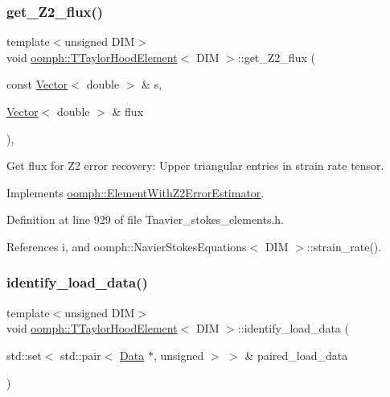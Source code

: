 \subsubsection{\texorpdfstring{get\+\_\+\+Z2\+\_\+flux()}{get\_Z2\_flux()}}
{\footnotesize\ttfamily template$<$unsigned D\+IM$>$ \\
void \hyperlink{classoomph_1_1TTaylorHoodElement}{oomph\+::\+T\+Taylor\+Hood\+Element}$<$ D\+IM $>$\+::get\+\_\+\+Z2\+\_\+flux (\begin{DoxyParamCaption}\item[{const \hyperlink{classoomph_1_1Vector}{Vector}$<$ double $>$ \&}]{s,  }\item[{\hyperlink{classoomph_1_1Vector}{Vector}$<$ double $>$ \&}]{flux }\end{DoxyParamCaption})\hspace{0.3cm}{\ttfamily [inline]}, {\ttfamily [virtual]}}



Get \textquotesingle{}flux\textquotesingle{} for Z2 error recovery\+: Upper triangular entries in strain rate tensor. 



Implements \hyperlink{classoomph_1_1ElementWithZ2ErrorEstimator_a5688ff5f546d81771cabad82ca5a7556}{oomph\+::\+Element\+With\+Z2\+Error\+Estimator}.



Definition at line 929 of file Tnavier\+\_\+stokes\+\_\+elements.\+h.



References i, and oomph\+::\+Navier\+Stokes\+Equations$<$ D\+I\+M $>$\+::strain\+\_\+rate().

\mbox{\label{classoomph_1_1TTaylorHoodElement_adfc82bce12e96bb4e93e855dd16ac195}} 
\subsubsection{\texorpdfstring{identify\+\_\+load\+\_\+data()}{identify\_load\_data()}}
{\footnotesize\ttfamily template$<$unsigned D\+IM$>$ \\
void \hyperlink{classoomph_1_1TTaylorHoodElement}{oomph\+::\+T\+Taylor\+Hood\+Element}$<$ D\+IM $>$\+::identify\+\_\+load\+\_\+data (\begin{DoxyParamCaption}\item[{std\+::set$<$ std\+::pair$<$ \hyperlink{classoomph_1_1Data}{Data} $\ast$, unsigned $>$ $>$ \&}]{paired\+\_\+load\+\_\+data }\end{DoxyParamCaption})\hspace{0.3cm}{\ttfamily [virtual]}}




